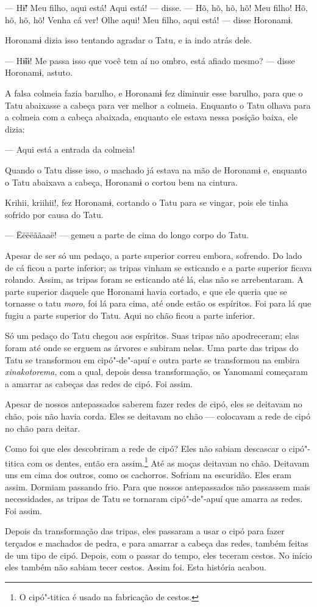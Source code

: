--- Hɨ̃! Meu filho, aqui está! Aqui está! --- disse. --- Hõ, hõ, hõ,
hõ! Meu filho! Hõ, hõ, hõ, hõ! Venha cá ver! Olhe aqui! Meu filho, aqui
está! --- disse Horonamɨ. 

Horonamɨ dizia isso tentando agradar o Tatu, e ia indo atrás dele. 

--- Hɨ̃ɨɨ! Me passa isso que você tem aí no ombro, está afiado
mesmo? --- disse Horonamɨ, astuto. 

A falsa colmeia fazia barulho, e Horonamɨ fez diminuir esse barulho,
para que o Tatu abaixasse a cabeça para ver melhor a colmeia. Enquanto o
Tatu olhava para a colmeia com a cabeça abaixada, enquanto ele estava
nessa posição baixa, ele dizia:

--- Aqui está a entrada da colmeia! 

Quando o Tatu disse isso, o machado já estava na mão de Horonamɨ e,
enquanto o Tatu abaixava a cabeça, Horonamɨ o cortou bem na cintura. 

Krihii, kriihii!, fez Horonamɨ, cortando o Tatu para se vingar, pois
ele tinha sofrido por causa do Tatu. 

--- Ëëëëããaaë! --- gemeu a parte de cima do longo corpo do Tatu. 

Apesar de ser só um pedaço, a parte superior correu embora, sofrendo. Do
lado de cá ficou a parte inferior; as tripas vinham se esticando e a
parte superior ficava rolando. Assim, as tripas foram se esticando até
lá, elas não se arrebentaram. A parte superior daquele que Horonamɨ
havia cortado, e que ele queria que se tornasse o tatu \emph{moro}, foi
lá para cima, até onde estão os espíritos. Foi para lá que fugiu a parte
superior do Tatu. Aqui no chão ficou a parte inferior. 

Só um pedaço do Tatu chegou aos espíritos. Suas tripas não apodreceram;
elas foram até onde se erguem as árvores e subiram nelas. Uma parte das
tripas do Tatu se transformou em cipó"-de"-apuí e outra parte se
transformou na embira \emph{xinakotorema}, com a qual, depois dessa
transformação, os Yanomami começaram a amarrar as cabeças das redes de
cipó. Foi assim.

Apesar de nossos antepassados saberem fazer redes de cipó, eles se
deitavam no chão, pois não havia corda. Eles se deitavam no chão ---
colocavam a rede de cipó no chão para deitar. 

Como foi que eles descobriram a rede de cipó? Eles não sabiam descascar
o cipó"-titica com os dentes, então era assim.\footnote{  O cipó"-titica é usado na fabricação de cestos.}  Até as
moças deitavam no chão. Deitavam uns em cima dos outros, como os
cachorros. Sofriam na escuridão. Eles eram assim. Dormiam passando frio.
Para que nossos antepassados não passassem mais necessidades, as tripas
de Tatu se tornaram cipó"-de"-apuí que amarra as redes. Foi assim. 

Depois da transformação das tripas, eles passaram a usar o cipó para
fazer terçados e machados de pedra, e para amarrar a cabeça das redes,
também feitas de um tipo de cipó. Depois, com o passar do tempo, eles
teceram cestos. No início eles também não sabiam tecer cestos. Assim
foi. Esta história acabou.

 
